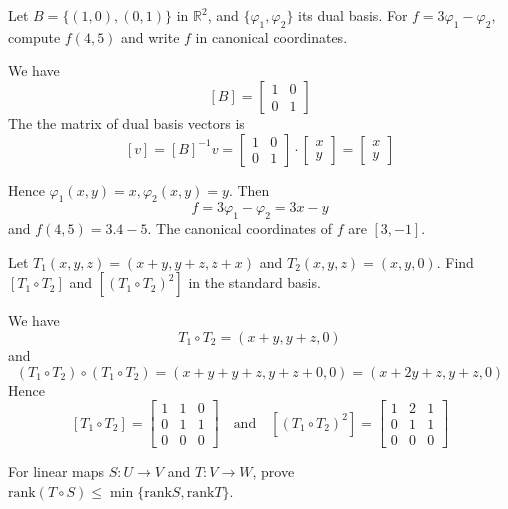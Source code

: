 \documentclass[11pt]{article}
\begin{document}
\begin{problem}
Let $B=\{(1,0),(0,1)\}$ in $\mathbb{R}^2$, and $\{\varphi_1,\varphi_2\}$ its dual basis. For $f=3\varphi_1-\varphi_2$, compute $f(4,5)$ and write $f$ in canonical coordinates.
\end{problem}
\begin{sol}
    We have 
    \[
        [B] = \begin{bmatrix}
            1&0\\
            0&1
        \end{bmatrix}
    \]
    The the matrix of dual basis vectors is 
    \[
        [v] = [B]^{-1}v = \begin{bmatrix}
            1&0\\
            0&1
        \end{bmatrix}\cdot\begin{bmatrix}
            x\\y
        \end{bmatrix} = \begin{bmatrix}
            x\\y
        \end{bmatrix}
    \]
\end{sol}
Hence $\varphi_1(x,y) = x, \varphi_2(x,y) = y$. Then 
\[
    f = 3\varphi_1 - \varphi_2 = 3x - y
\]
and $f(4,5) = 3.4 - 5$. The canonical coordinates of $f$ are $[3,-1]$.
\begin{problem}
Let $T_1(x,y,z)=(x+y,y+z,z+x)$ and $T_2(x,y,z)=(x,y,0)$. Find $[T_1\circ T_2]$ and $[(T_1\circ T_2)^2]$ in the standard basis.
\end{problem}
\begin{sol}
    We have 
    \[
        T_1\circ T_2 = (x + y,y + z,0)
    \]
    and 
    \[
        (T_1 \circ T_2) \circ (T_1 \circ T_2) = (x + y + y + z, y + z + 0, 0) = (x + 2y + z, y + z, 0)
    \]
    Hence 
    \[  
    [T_1\circ T_2] = \begin{bmatrix}
            1&1&0\\
            0&1&1\\
            0&0&0
    \end{bmatrix}
    \quad\text{and}\quad
    [(T_1\circ T_2)^2] = \begin{bmatrix}
        1&2&1\\
        0&1&1\\
        0&0&0
    \end{bmatrix}
    \]
\end{sol}
\begin{problem}
For linear maps $S:U\to V$ and $T:V\to W$, prove $\mathrm{rank}(T\circ S)\le \min\{\mathrm{rank} S,\mathrm{rank} T\}$.
\end{problem}
\end{document}
